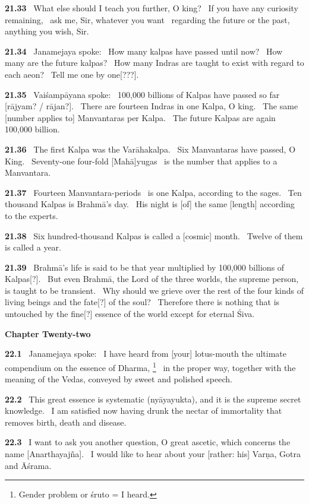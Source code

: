 \documentclass{article}
\begin{document}
\textbf{21.33}%
\ What else should I teach you further, O king?%
\ If you have any curiosity remaining,%
\ ask me,  Sir, whatever you want%
\ regarding the future or the past, anything you wish, Sir.%


\textbf{21.34}%
\ Janamejaya spoke:%
\ How many kalpas have passed until now?%
\ How many are the future kalpas?%
\ How many Indras are taught to exist with regard to each aeon?%
\ Tell me one by one[???].%


\textbf{21.35}%
\ Vaiśampāyana spoke:%
\ 100,000 billions of Kalpas have passed so far [rājyam? / rājan?].%
\ There are fourteen Indras in one Kalpa, O king.%
\ The same [number applies to] Manvantaras per Kalpa.%
\ The future Kalpas are again 100,000 billion.%


\textbf{21.36}%
\ The first Kalpa was the Varāhakalpa.%
\ Six Manvantaras have passed, O King.%
\ Seventy-one four-fold [Mahā]yugas%
\ is the number that applies to a Manvantara.%


\textbf{21.37}%
\ Fourteen Manvantara-periods%
\ is one Kalpa, according to the sages.%
\ Ten thousand Kalpas is Brahmā's day.%
\ His night is [of] the same [length] according to the experts.%


\textbf{21.38}%
\ Six hundred-thousand Kalpas is called a [cosmic] month.%
\ Twelve of them is called a year.%


\textbf{21.39}%
\ Brahmā's life is said to be that year multiplied by 100,000 billions of Kalpas[?].%
\ But even Brahmā, the Lord of the three worlds, the supreme person, is taught to be transient.%
\ Why should we grieve over the rest of the four kinds of living beings and the fate[?] of the soul?%
\ Therefore there is nothing that is untouched by the fine[?] essence of the world except for eternal Śiva.%
\vfill\pagebreak\begin{center}{\large\textbf{ Chapter Twenty-two 
}}\end{center}


\textbf{22.1}%
\ Janamejaya spoke:%
\ I have heard from [your] lotus-mouth the ultimate compendium on the essence of Dharma,%
\footnote{Gender problem or śruto = I heard. }%
\ in the proper way, together with the meaning of the Vedas, conveyed by sweet and polished speech.%


\textbf{22.2}%
\ This great essence is systematic (nyāyayukta), and it is the supreme secret knowledge.%
\ I am satisfied now having drunk the nectar of immortality that removes birth, death and disease.%


\textbf{22.3}%
\ I want to ask you another question, O great ascetic, which concerns the name [Anarthayajña].%
\ I would like to hear about your [rather: his] Varṇa, Gotra and Āśrama.%
\end{document}
